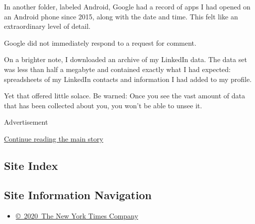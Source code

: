 In another folder, labeled Android, Google had a record of apps I had
opened on an Android phone since 2015, along with the date and time.
This felt like an extraordinary level of detail.

Google did not immediately respond to a request for comment.

On a brighter note, I downloaded an archive of my LinkedIn data. The
data set was less than half a megabyte and contained exactly what I had
expected: spreadsheets of my LinkedIn contacts and information I had
added to my profile.

Yet that offered little solace. Be warned: Once you see the vast amount
of data that has been collected about you, you won't be able to unsee
it.

Advertisement

\protect\hyperlink{after-bottom}{Continue reading the main story}

\hypertarget{site-index}{%
\subsection{Site Index}\label{site-index}}

\hypertarget{site-information-navigation}{%
\subsection{Site Information
Navigation}\label{site-information-navigation}}

\begin{itemize}
\tightlist
\item
  \href{https://help.nytimes3xbfgragh.onion/hc/en-us/articles/115014792127-Copyright-notice}{©~2020~The
  New York Times Company}
\end{itemize}

